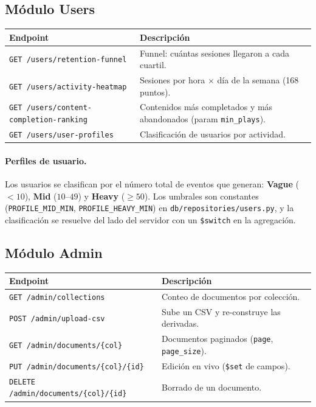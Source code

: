 \documentclass[12pt, letterpaper]{article}
\newcommand{\code}[1]{\texttt{#1}}
\begin{document}
\subsection{Módulo Users}
\begin{center}
\begin{tabular}{@{}lL{7.5cm}@{}}
\toprule
\textbf{Endpoint} & \textbf{Descripción} \\
\midrule
\code{GET /users/retention-funnel} & Funnel: cuántas sesiones llegaron a cada cuartil. \\
\code{GET /users/activity-heatmap} & Sesiones por hora $\times$ día de la semana (168 puntos). \\
\code{GET /users/content-completion-ranking} & Contenidos más completados y más abandonados (param \code{min\_plays}). \\
\code{GET /users/user-profiles} & Clasificación de usuarios por actividad. \\
\bottomrule
\end{tabular}
\end{center}

\paragraph{Perfiles de usuario.} Los usuarios se clasifican por el número total
de eventos que generan: \textbf{Vague} ($<10$), \textbf{Mid} ($10$–$49$) y
\textbf{Heavy} ($\geq 50$). Los umbrales son constantes
(\code{PROFILE\_MID\_MIN}, \code{PROFILE\_HEAVY\_MIN}) en
\code{db/repositories/users.py}, y la clasificación se resuelve del lado del
servidor con un \code{\$switch} en la agregación.

\subsection{Módulo Admin}
\begin{center}
\begin{tabular}{@{}lL{7.5cm}@{}}
\toprule
\textbf{Endpoint} & \textbf{Descripción} \\
\midrule

\code{GET /admin/collections} & Conteo de documentos por colección. \\
\code{POST /admin/upload-csv} & Sube un CSV y re-construye las derivadas. \\
\code{GET /admin/documents/\{col\}} & Documentos paginados (\code{page}, \code{page\_size}). \\
\code{PUT /admin/documents/\{col\}/\{id\}} & Edición en vivo (\code{\$set} de campos). \\
\code{DELETE /admin/documents/\{col\}/\{id\}} & Borrado de un documento. \\
\bottomrule
\end{tabular}
\end{center}
\end{document}
